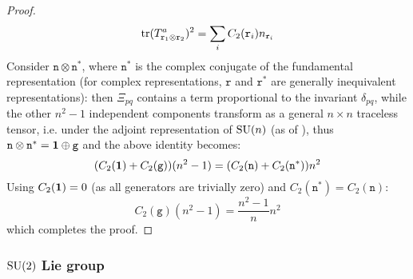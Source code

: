 \begin{proofbox}
\begin{proof}
    \begin{equation*}
      \operatorname{tr} (T^a_{\mathtt{r}_1 \otimes \mathtt{r}_2})^2 = \sum_i C_2(\mathtt{r}_i) n_{\mathtt{r}_i}
    \end{equation*}
    Consider $ \mathtt{n} \otimes \mathtt{n}^* $, where $ \mathtt{n}^* $ is the complex conjugate of the fundamental representation (for complex representations, $ \mathtt{r} $ and $ \mathtt{r}^* $ are generally inequivalent representations): then $ \Xi_{pq} $ contains a term proportional to the invariant $ \delta_{pq} $, while the other $ n^2 - 1 $  independent components transform as a general $ n \times n $ traceless tensor, i.e. under the adjoint representation of $ \mathrm{SU}(n) $ (as of ), thus $ \mathtt{n} \otimes \mathtt{n}^* = \mathbf{1} \oplus \mathtt{g} $ and the above identity becomes:
    \begin{equation*}
      (C_2(\mathbf{1}) + C_2(\mathtt{g})) (n^2 - 1) = (C_2(\mathtt{n}) + C_2(\mathtt{n}^*)) n^2
    \end{equation*}
    Using $ C_2(\mathbf{1}) = 0 $ (as all generators are trivially zero) and $ C_2(\mathtt{n}^*) = C_2(\mathtt{n}) $:
    \begin{equation*}
      C_2(\mathtt{g}) (n^2 - 1) = \frac{n^2 - 1}{n} n^2
    \end{equation*}
    which completes the proof.
  \end{proof}
\end{proofbox}

\subsubsection{$ \mathrm{SU}(2) $ Lie group}

